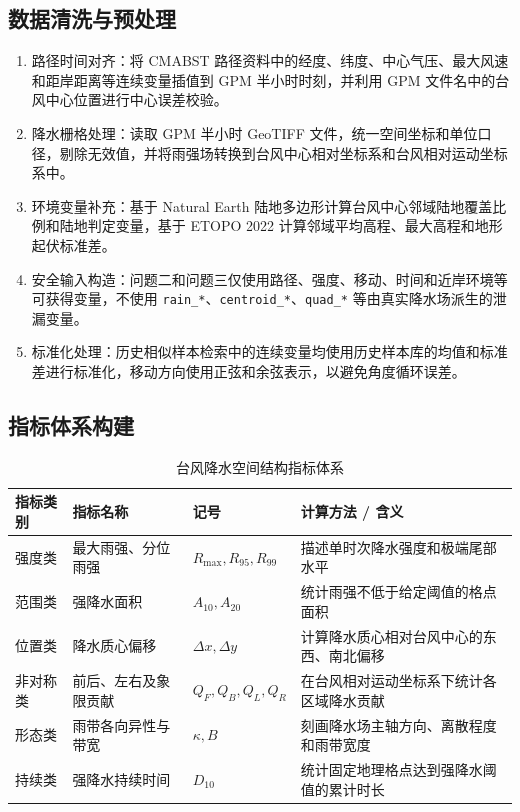 \documentclass[UTF8,a4paper,zihao=5,fontset=fandol]{ctexart}
\numberwithin{equation}{section}
\numberwithin{figure}{section}
\numberwithin{table}{section}
\begin{document}
\subsection{数据清洗与预处理}
\begin{enumerate}
  \item 路径时间对齐：将 CMABST 路径资料中的经度、纬度、中心气压、最大风速和距岸距离等连续变量插值到 GPM 半小时时刻，并利用 GPM 文件名中的台风中心位置进行中心误差校验。
  \item 降水栅格处理：读取 GPM 半小时 GeoTIFF 文件，统一空间坐标和单位口径，剔除无效值，并将雨强场转换到台风中心相对坐标系和台风相对运动坐标系中。
  \item 环境变量补充：基于 Natural Earth 陆地多边形计算台风中心邻域陆地覆盖比例和陆地判定变量，基于 ETOPO 2022 计算邻域平均高程、最大高程和地形起伏标准差。
  \item 安全输入构造：问题二和问题三仅使用路径、强度、移动、时间和近岸环境等可获得变量，不使用 \texttt{rain\_*}、\texttt{centroid\_*}、\texttt{quad\_*} 等由真实降水场派生的泄漏变量。
  \item 标准化处理：历史相似样本检索中的连续变量均使用历史样本库的均值和标准差进行标准化，移动方向使用正弦和余弦表示，以避免角度循环误差。
\end{enumerate}

\subsection{指标体系构建}
\begin{table}[H]
  \centering
  \caption{台风降水空间结构指标体系}
  \begin{tabularx}{\linewidth}{lXlX}
    \toprule
    指标类别 & 指标名称 & 记号 & 计算方法 / 含义 \\
    \midrule
    强度类 & 最大雨强、分位雨强 & $R_{\max},R_{95},R_{99}$ & 描述单时次降水强度和极端尾部水平 \\
    范围类 & 强降水面积 & $A_{10},A_{20}$ & 统计雨强不低于给定阈值的格点面积 \\
    位置类 & 降水质心偏移 & $\Delta x,\Delta y$ & 计算降水质心相对台风中心的东西、南北偏移 \\
    非对称类 & 前后、左右及象限贡献 & $Q_F,Q_B,Q_L,Q_R$ & 在台风相对运动坐标系下统计各区域降水贡献 \\
    形态类 & 雨带各向异性与带宽 & $\kappa,B$ & 刻画降水场主轴方向、离散程度和雨带宽度 \\
    持续类 & 强降水持续时间 & $D_{10}$ & 统计固定地理格点达到强降水阈值的累计时长 \\
    \bottomrule
  \end{tabularx}
\end{table}
\end{document}

